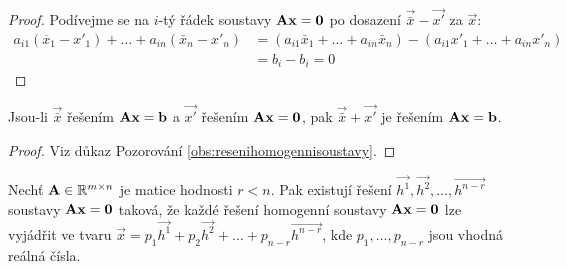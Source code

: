 \begin{proof}
    Podívejme se na $i$-tý řádek soustavy $\mathbf{A}\mathbf{x} = \mathbf{0}$ po
    dosazení $\vec{\bar{x}} - \vec{x'}$ za $\vec{x}$:
    \begin{align*}
        a_{i1}(\overline{x}_1 - x'_1) + \dots + a_{in}(\bar{x}_n - x'_n) &= 
            (a_{i1}\bar{x}_1 + \dots + a_{in}\bar{x}_n) - (a_{i1}x'_1 + \dots
            + a_{in}x'_n) \\
            &= b_i - b_i = 0
    \end{align*}
\end{proof}

\begin{observation}
    Jsou-li $\vec{\bar{x}}$ řešením $\mathbf{A}\mathbf{x} = \mathbf{b}$ a $\vec{x'}$
    řešením $\mathbf{A}\mathbf{x} = \mathbf{0}$, pak $\vec{\bar{x}} + \vec{x'}$ je
    řešením $\mathbf{A}\mathbf{x} = \mathbf{b}$.
\end{observation}

\begin{proof}
    Viz důkaz Pozorování \ref{obs:resenihomogennisoustavy}.
\end{proof}

\begin{theorem}
    Nechť $\mathbf{A} \in \mathbb{R}^{m \times n}$ je matice hodnosti $r < n$.
    Pak existují řešení $\vec{h^1},\vec{h^2},\dots,\vec{h^{n-r}}$ soustavy 
    $\mathbf{A}\mathbf{x} = \mathbf{0}$ taková, že každé řešení homogenní 
    soustavy $\mathbf{A}\mathbf{x} = \mathbf{0}$ 
    lze vyjádřit ve tvaru $\vec{x} = p_1\vec{h^1} + p_2\vec{h^2} + \dots +
    p_{n-r}\vec{h^{n-r}}$, kde $p_1,\dots,p_{n-r}$ jsou vhodná reálná čísla.
\end{theorem}

